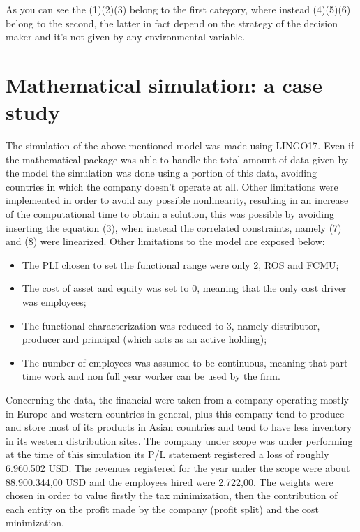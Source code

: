 \documentclass{article}
\begin{document}
As you can see the (1)(2)(3) belong to the first category, where instead (4)(5)(6) belong to the second, the latter in fact depend on the strategy of the decision maker and it's not given by any environmental variable.

\pagebreak

\section{Mathematical simulation: a case study}
The simulation of the above-mentioned model was made using LINGO17. Even if the mathematical package was able to handle the total amount of data given by the model the simulation was done using a portion of this data, avoiding countries in which the company doesn't operate at all. Other limitations were implemented in order to avoid any possible nonlinearity, resulting in an increase of the computational time to obtain a solution, this was possible by avoiding inserting the equation (3), when instead the correlated constraints, namely (7) and (8) were linearized. Other limitations to the model are exposed below:
\begin{itemize}
    \item The PLI chosen to set the functional range were only 2, ROS and FCMU;
    \item The cost of asset and equity was set to 0, meaning that the only cost driver was employees;
    \item The functional characterization was reduced to 3, namely distributor, producer and principal (which acts as an active holding);
    \item The number of employees was assumed to be continuous, meaning that part-time work and non full year worker can be used by the firm.
\end{itemize}

Concerning the data, the financial were taken from a company operating mostly in Europe and western countries in general, plus this company tend to produce and store most of its products in Asian countries and tend to have less inventory in its western distribution sites. The company under scope was under performing at the time of this simulation its P/L statement registered a loss of roughly  6.960.502 USD. The revenues registered for the year under the scope were about 88.900.344,00 USD and the employees hired were 2.722,00.
The weights were chosen in order to value firstly the tax minimization, then the contribution of each entity on the profit made by the company (profit split) and the cost minimization.
\end{document}

